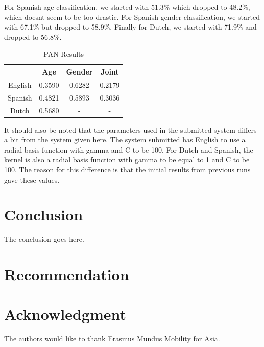 \documentclass[conference]{IEEEtran}
\begin{document}
For Spanish age classification, we started with 51.3\% which dropped to 48.2\%, which doesnt seem to be too drastic. For Spanish gender classification, we started with 67.1\% but dropped to 58.9\%. Finally for Dutch, we started with 71.9\% and dropped to 56.8\%.
\begin{table}[!htbp]
\centering
\caption{PAN Results}
\label{PANResults}
\setlength{\tabcolsep}{0.5em}
{\renewcommand{\arraystretch}{1.2}%
\begin{tabular}{cccc}
\toprule
        & Age    & Gender & Joint  \\
\midrule
English & 0.3590 & 0.6282 & 0.2179 \\
Spanish & 0.4821 & 0.5893 & 0.3036 \\
Dutch   & 0.5680 &   -     &  -    \\
\bottomrule 
\end{tabular}
}
\end{table}

It should also be noted that the parameters used in the submitted system differs a bit from the system given here. The system submitted has English to use a radial basis function with gamma and C to be 100. For Dutch and Spanish, the kernel is also a radial basis function with gamma to be equal to 1 and C to be 100. The reason for this difference is that the initial results from previous runs gave these values. 




\section{Conclusion}
The conclusion goes here.

\section{Recommendation}





\section*{Acknowledgment}

The authors would like to thank Erasmus Mundus Mobility for Asia. 





\end{document}
